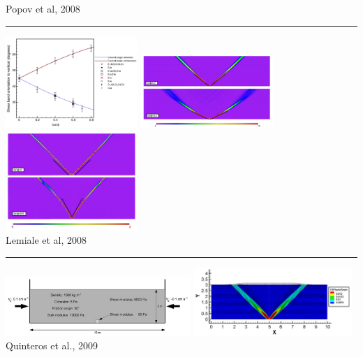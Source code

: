 \begin{center}
\begin{minipage}{0.45\textwidth}
{\captionfont Popov et al, 2008 \cite{poso08}}
\end{minipage}
\end{center}

\begin{center}\noindent\rule{8cm}{0.4pt}\end{center}

\begin{center}
\includegraphics[width=5cm]{images/benchmark_brick/lemm08a}
\includegraphics[width=5cm]{images/benchmark_brick/lemm08b}
\includegraphics[width=5cm]{images/benchmark_brick/lemm08c}\\
{\captionfont Lemiale et al, 2008 \cite{lemm08}}
\end{center}

\begin{center}\noindent\rule{8cm}{0.4pt}\end{center}

\begin{center}
\includegraphics[width=7cm]{images/benchmark_brick/qurj09b}
\includegraphics[width=6cm]{images/benchmark_brick/qurj09a}\\
{\captionfont Quinteros et al., 2009 \cite{qurj09}}
\end{center}

